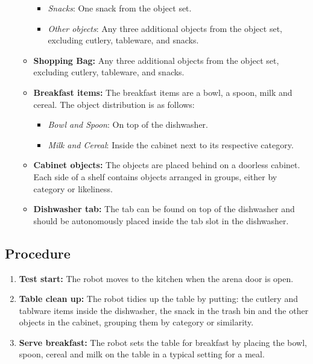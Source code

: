 \begin{itemize}[nosep]
\begin{itemize}
\begin{itemize}[nosep]
				\item\textit{Snacks}: One snack from the object set.
				\item\textit{Other objects}: Any three additional objects from the object set, excluding cutlery, tableware, and snacks.
			\end{itemize}
			\item \textbf{Shopping Bag:} Any three additional objects from the object set, excluding cutlery, tableware, and snacks.
			\item \textbf{Breakfast items:} The breakfast items are a bowl, a spoon, milk and cereal. 
			The object distribution is as follows:
			\begin{itemize}[nosep]
				\item\textit{Bowl and Spoon}: On top of the dishwasher.
				\item\textit{Milk and Cereal}: Inside the cabinet next to its respective category.
			\end{itemize}
			\item \textbf{Cabinet objects:} The objects are placed behind on a doorless cabinet. Each side of a shelf contains objects arranged in groups, either by category or likeliness.
			\item \textbf{Dishwasher tab:} The tab can be found on top of the dishwasher and should be autonomously placed inside the tab slot in the dishwasher.
		\end{itemize}
\end{itemize}


\subsection*{Procedure}
\begin{enumerate}[nosep]
	\item \textbf{Test start:} The robot moves to the kitchen when the arena door is open.
	\item \textbf{Table clean up:} The robot tidies up the table by putting: the cutlery and tablware items inside the dishwasher, the snack in the trash bin and the other objects in the cabinet, grouping them by category or similarity.
	\item \textbf{Serve breakfast:} The robot sets the table for breakfast by placing the bowl, spoon, cereal and milk on the table in a typical setting for a meal.
\end{enumerate}


